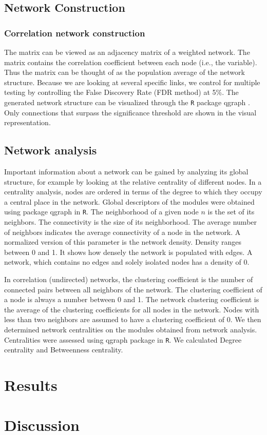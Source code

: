 \documentclass[a4paper]{article}
\begin{document}
\subsection*{Network Construction}
\subsubsection*{Correlation network construction}

The matrix can be viewed as an adjacency matrix of a weighted network. The matrix contains the correlation coefficient between each node (i.e., the variable). Thus the matrix can be thought of as the population average of the network structure. Because we are looking at several specific links, we control for multiple testing by controlling the False Discovery Rate (FDR method) at 5\%. The generated network structure can be visualized through the \texttt{R} package qgraph \citep{qgraph}. Only connections that surpass the significance threshold are shown in the visual representation. 

\subsection*{Network analysis}
Important information about a network can be gained by analyzing its global structure, for example by looking at the relative centrality of different nodes. In a centrality analysis, nodes are ordered in terms of the degree to which they occupy a central place in the network. Global descriptors of the modules were obtained using package qgraph in \texttt{R}. The neighborhood of a given node $n$ is the set of its neighbors. The connectivity is the size of its neighborhood. The average number of neighbors indicates the average connectivity of a node in the network. A normalized version of this parameter is the network density. Density ranges between 0 and 1. It shows how densely the network is populated with edges. A network, which contains no edges and solely isolated nodes has a density of 0. 

In correlation (undirected) networks, the clustering coefficient is the number of connected pairs between all neighbors of the network. The clustering coefficient of a node is always a number between 0 and 1. The network clustering coefficient is the average of the clustering coefficients for all nodes in the network. Nodes with less than two neighbors are assumed to have a clustering coefficient of 0. We then determined network centralities on the modules obtained from network analysis. Centralities were assessed using qgraph package in \texttt{R}. We calculated Degree centrality and Betweenness centrality.


\section*{Results}

\section*{Discussion}


\end{document}
